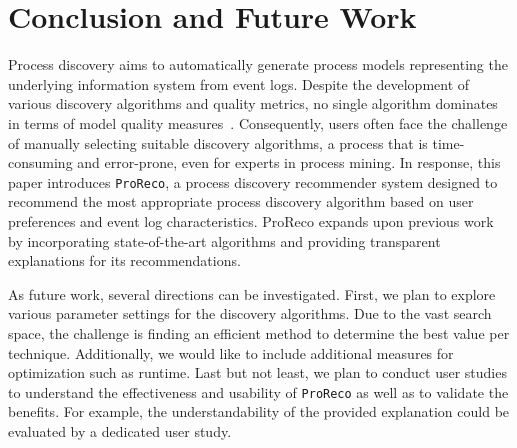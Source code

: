 \section{Conclusion and Future Work}\label{sec:conclusion}
Process discovery aims to automatically generate process models representing the underlying information system from event logs. 
Despite the development of various discovery algorithms and quality metrics, no single algorithm dominates in terms of model quality measures~\cite{AugustoCDRMMMS19PDreviewbenchmark}. 
Consequently, users often face the challenge of manually selecting suitable discovery algorithms, a process that is time-consuming and error-prone, even for experts in process mining. 
In response, this paper introduces \texttt{ProReco}, a process discovery recommender system designed to recommend the most appropriate process discovery algorithm based on user preferences and event log characteristics. 
ProReco expands upon previous work by incorporating state-of-the-art algorithms and providing transparent explanations for its recommendations.

As future work, several directions can be investigated. 
First, we plan to explore various parameter settings for the discovery algorithms. 
Due to the vast search space, the challenge is finding an efficient method to determine the best value per technique. 
Additionally, we would like to include additional measures for optimization such as runtime. 
Last but not least, we plan to conduct user studies to understand the effectiveness and usability of \texttt{ProReco} as well as to validate the benefits. 
For example, the understandability of the provided explanation could be evaluated by a dedicated user study. 
